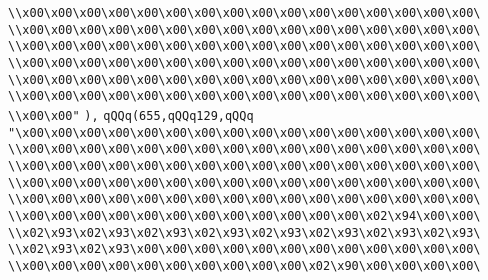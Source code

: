 \verb|\\x00\x00\x00\x00\x00\x00\x00\x00\x00\x00\x00\x00\x00\x00\x00\x00\|\newline
\verb|\\x00\x00\x00\x00\x00\x00\x00\x00\x00\x00\x00\x00\x00\x00\x00\x00\|\newline
\verb|\\x00\x00\x00\x00\x00\x00\x00\x00\x00\x00\x00\x00\x00\x00\x00\x00\|\newline
\verb|\\x00\x00\x00\x00\x00\x00\x00\x00\x00\x00\x00\x00\x00\x00\x00\x00\|\newline
\verb|\\x00\x00\x00\x00\x00\x00\x00\x00\x00\x00\x00\x00\x00\x00\x00\x00\|\newline
\verb|\\x00\x00\x00\x00\x00\x00\x00\x00\x00\x00\x00\x00\x00\x00\x00\x00\|\newline
\verb|\\x00\x00"|\newline
\verb|),|\newline
\verb|qQQq(655,qQQq129,qQQq|\newline
\verb|"\x00\x00\x00\x00\x00\x00\x00\x00\x00\x00\x00\x00\x00\x00\x00\x00\|\newline
\verb|\\x00\x00\x00\x00\x00\x00\x00\x00\x00\x00\x00\x00\x00\x00\x00\x00\|\newline
\verb|\\x00\x00\x00\x00\x00\x00\x00\x00\x00\x00\x00\x00\x00\x00\x00\x00\|\newline
\verb|\\x00\x00\x00\x00\x00\x00\x00\x00\x00\x00\x00\x00\x00\x00\x00\x00\|\newline
\verb|\\x00\x00\x00\x00\x00\x00\x00\x00\x00\x00\x00\x00\x00\x00\x00\x00\|\newline
\verb|\\x00\x00\x00\x00\x00\x00\x00\x00\x00\x00\x00\x00\x02\x94\x00\x00\|\newline
\verb|\\x02\x93\x02\x93\x02\x93\x02\x93\x02\x93\x02\x93\x02\x93\x02\x93\|\newline
\verb|\\x02\x93\x02\x93\x00\x00\x00\x00\x00\x00\x00\x00\x00\x00\x00\x00\|\newline
\verb|\\x00\x00\x00\x00\x00\x00\x00\x00\x00\x00\x02\x90\x00\x00\x00\x00\|\newline
